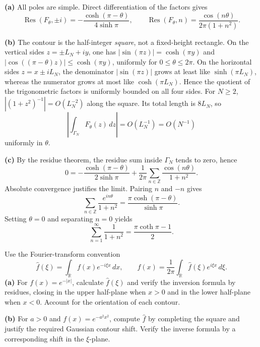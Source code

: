 \begin{solution}


\textbf{(a)} All poles are simple. Direct differentiation of the factors gives
\[
\operatorname{Res}(F_\theta,\pm i)=-\frac{\cosh(\pi-\theta)}{4\sinh\pi},\qquad
\operatorname{Res}(F_\theta,n)=\frac{\cos(n\theta)}{2\pi(1+n^2)}.
\]

\textbf{(b)} The contour is the half-integer \emph{square}, not a fixed-height rectangle. On the vertical sides $z=\pm L_N+iy$, one has $|\sin(\pi z)|=\cosh(\pi y)$ and $|\cos((\pi-\theta)z)|\le\cosh(\pi y)$, uniformly for $0\le\theta\le2\pi$. On the horizontal sides $z=x\pm iL_N$, the denominator $|\sin(\pi z)|$ grows at least like $\sinh(\pi L_N)$, whereas the numerator grows at most like $\cosh(\pi L_N)$. Hence the quotient of the trigonometric factors is uniformly bounded on all four sides. For $N\ge2$, $|(1+z^2)^{-1}|=O(L_N^{-2})$ along the square. Its total length is $8L_N$, so
\[
\left|\int_{\Gamma_N}F_\theta(z)\,dz\right|=O(L_N^{-1})=O(N^{-1})
\]
uniformly in $\theta$.

\textbf{(c)} By the residue theorem, the residue sum inside $\Gamma_N$ tends to zero, hence
\[
0=-\frac{\cosh(\pi-\theta)}{2\sinh\pi}
+\frac1{2\pi}\sum_{n\in\mathbb Z}\frac{\cos(n\theta)}{1+n^2}.
\]
Absolute convergence justifies the limit. Pairing $n$ and $-n$ gives
\[
\boxed{\displaystyle \sum_{n\in\mathbb Z}\frac{e^{in\theta}}{1+n^2}
=\frac{\pi\cosh(\pi-\theta)}{\sinh\pi}.}
\]
Setting $\theta=0$ and separating $n=0$ yields
\[
\boxed{\displaystyle \sum_{n=1}^{\infty}\frac1{1+n^2}
=\frac{\pi\coth\pi-1}{2}.}
\]
\end{solution}


\begin{problem}[CP-IV-0099]
\label{prob:cp-iv-0099}
Use the Fourier-transform convention
\[
\widehat f(\xi)=\int_{\mathbb R}f(x)e^{-i\xi x}\,dx,
\qquad
f(x)=\frac{1}{2\pi}\int_{\mathbb R}\widehat f(\xi)e^{i\xi x}\,d\xi.
\]
\textbf{(a)} For $f(x)=e^{-|x|}$, calculate $\widehat f(\xi)$ and
verify the inversion formula by residues, closing in the upper half-plane
when $x>0$ and in the lower half-plane when $x<0$. Account for the
orientation of each contour.

\textbf{(b)} For $a>0$ and $f(x)=e^{-a^2x^2}$, compute $\widehat f$ by
completing the square and justify the required Gaussian contour shift.
Verify the inverse formula by a corresponding shift in the $\xi$-plane.
\end{problem}

